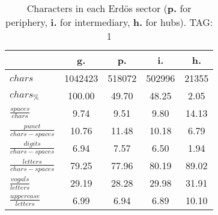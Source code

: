 \begin{table}[h!]
\begin{center}
\begin{tabular}{| l || c | c | c | c |}\hline
 & {\bf g.} & {\bf p.} & {\bf i.} & {\bf h.} \\\hline\hline
$chars$ & 1042423  & 518072  & 502996  & 21355 \\
$chars_{\%}$ & 100.00  & 49.70  & 48.25  & 2.05 \\\hline
$\frac{spaces}{chars}$ & 9.74  & 9.51  & 9.80  & 14.13 \\
$\frac{punct}{chars-spaces}$ & 10.76  & 11.48  & 10.18  & 6.79 \\
$\frac{digits}{chars-spaces}$ & 6.94  & 7.57  & 6.50  & 1.94 \\\hline
$\frac{letters}{chars-spaces}$ & 79.25  & 77.96  & 80.19  & 89.02 \\
$\frac{vogals}{letters}$ & 29.19  & 28.28  & 29.98  & 31.91 \\
$\frac{uppercase}{letters}$ & 6.99  & 6.94  & 6.89  & 10.10 \\\hline
\end{tabular}
\caption{Characters in each Erd\"os sector ({{\bf p.}} for periphery, {{\bf i.}} for intermediary, 
    {{\bf h.}} for hubs). TAG: 1}
\end{center}
\end{table}